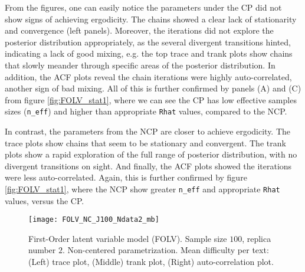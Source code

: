 From the figures, one can easily notice the parameters under the CP did not show signs of achieving ergodicity. The chains showed a clear lack of stationarity and convergence (left panels). Moreover, the iterations did not explore the posterior distribution appropriately, as the several divergent transitions hinted, indicating a lack of good mixing, e.g. the top trace and trank plots show chains that slowly meander through specific areas of the posterior distribution. In addition, the ACF plots reveal the chain iterations were highly auto-correlated, another sign of bad mixing. All of this is further confirmed by panels (A) and (C) from figure \ref{fig:FOLV_stat1}, where we can see the CP has low effective samples sizes (\texttt{n\_eff}) and higher than appropriate \texttt{Rhat} values, compared to the NCP.

In contrast, the parameters from the NCP are closer to achieve ergodicity. The trace plots show chains that seem to be stationary and convergent. The trank plots show a rapid exploration of the full range of posterior distribution, with no divergent transitions on sight. And finally, the ACF plots showed the iterations were less auto-correlated. Again, this is further confirmed by figure \ref{fig:FOLV_stat1}, where the NCP show greater \texttt{n\_eff} and appropriate \texttt{Rhat} values, versus the CP.
%
\begin{figure}[H]
	\centering
	\texttt{[image: FOLV\_NC\_J100\_Ndata2\_mb]}
	\caption[First-Order latent variable model (FOLV). Sample size $100$, replica number $2$. Non-centered parametrization. Mean difficulty per text. Trace, trank and auto-correlation plots.]%
	{First-Order latent variable model (FOLV). Sample size $100$, replica number $2$. Non-centered parametrization. Mean difficulty per text: (Left) trace plot, (Middle) trank plot, (Right) auto-correlation plot.}
	\label{fig:FOLV_NC_chains1}
\end{figure}

